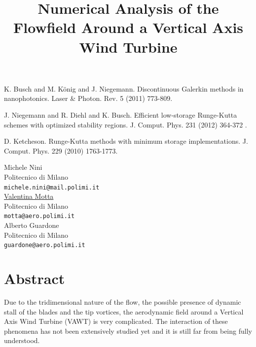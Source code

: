 \documentclass[article,A4,11pt]{llncs}%
\begin{document}

\begin{thebibliography}{10}
{\sc  K. Busch and M. K\"onig and J. Niegemann}. {Discontinuous Galerkin methods in nanophotonics}. Laser \& Photon. Rev. 5 (2011) 773-809.

{\sc J. Niegemann and R. Diehl and K. Busch}. {Efficient low-storage Runge-Kutta schemes with optimized stability regions}. J. Comput. Phys. 231 (2012) 364-372 .

{\sc D. Ketcheson}. {Runge-Kutta methods with minimum storage implementations}. J. Comput. Phys. 229 (2010) 1763-1773.
\end{thebibliography}

\title{Numerical Analysis of the Flowfield Around a Vertical Axis Wind Turbine}
 \author{} \institute{}
\maketitle
\begin{center}
{\large Michele Nini}\\
Politecnico di Milano\\
{\tt michele.nini@mail.polimi.it}
\\ \vspace{4mm}
{\large \underline{Valentina Motta}}\\
Politecnico di Milano\\
{\tt motta@aero.polimi.it}
\\ \vspace{4mm}
{\large Alberto Guardone}\\
Politecnico di Milano\\
{\tt guardone@aero.polimi.it}
\end{center}

\section*{Abstract}
Due to  the tridimensional nature of the flow, the possible presence of dynamic stall of the blades and the tip vortices, the aerodynamic field around a Vertical Axis Wind Turbine (VAWT) is very complicated. The interaction of these phenomena has not been extensively studied yet and it is still far from being fully understood.
\end{document}
